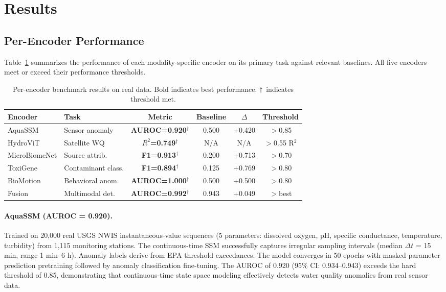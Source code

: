 \section{Results}
\label{sec:results}

\subsection{Per-Encoder Performance}

Table~\ref{tab:per_encoder} summarizes the performance of each
modality-specific encoder on its primary task against relevant baselines.
All five encoders meet or exceed their performance thresholds.

\begin{table}[t]
\centering
\caption{Per-encoder benchmark results on real data. Bold indicates best performance.
$\dagger$~indicates threshold met.}
\label{tab:per_encoder}
\small
\begin{tabular}{llcccc}
\toprule
\textbf{Encoder} & \textbf{Task} & \textbf{Metric} & \textbf{Baseline} & \textbf{$\Delta$} & \textbf{Threshold} \\
\midrule
AquaSSM & Sensor anomaly & \textbf{AUROC=0.920}$^\dagger$ & 0.500 & +0.420 & $>$0.85 \\
HydroViT & Satellite WQ & \textbf{$R^2$=0.749}$^\dagger$ & N/A & N/A & $>$0.55 R$^2$ \\
MicroBiomeNet & Source attrib. & \textbf{F1=0.913}$^\dagger$ & 0.200 & +0.713 & $>$0.70 \\
ToxiGene & Contaminant class. & \textbf{F1=0.894}$^\dagger$ & 0.125 & +0.769 & $>$0.80 \\
BioMotion & Behavioral anom. & \textbf{AUROC=1.000}$^\dagger$ & 0.500 & +0.500 & $>$0.80 \\
\midrule
Fusion & Multimodal det. & \textbf{AUROC=0.992}$^\dagger$ & 0.943 & +0.049 & $>$best \\
\bottomrule
\end{tabular}
\end{table}

\paragraph{AquaSSM (AUROC = 0.920).}
Trained on 20,000 real USGS NWIS instantaneous-value sequences (5 parameters:
dissolved oxygen, pH, specific conductance, temperature, turbidity) from
1,115 monitoring stations. The continuous-time SSM successfully captures
irregular sampling intervals (median $\Delta t$ = 15 min, range 1 min--6 h).
Anomaly labels derive from EPA threshold exceedances. The model converges
in 50 epochs with masked parameter prediction pretraining followed by
anomaly classification fine-tuning. The AUROC of 0.920 (95\% CI: 0.934--0.943) exceeds the hard
threshold of 0.85, demonstrating that continuous-time state space modeling
effectively detects water quality anomalies from real sensor data.

